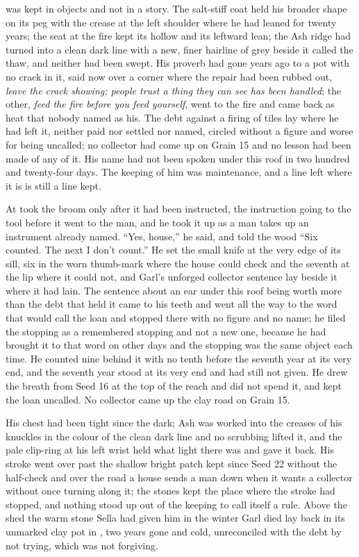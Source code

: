 \scenebreak

 was kept in objects and not in a story. The salt-stiff coat held his broader shape on its peg with the crease at the left shoulder where he had leaned for twenty years; the seat at the fire kept its hollow and its leftward lean; the Ash ridge had turned into a clean dark line with a new, finer hairline of grey beside it called the thaw, and neither had been swept. His proverb had gone years ago to a pot with no crack in it, said now over a corner where the repair had been rubbed out, \emph{leave the crack showing; people trust a thing they can see has been handled}; the other, \emph{feed the fire before you feed yourself}, went to the fire and came back as heat that nobody named as his. The debt against a firing of tiles lay where he had left it, neither paid nor settled nor named, circled without a figure and worse for being uncalled; no collector had come up  on Grain 15 and no lesson had been made of any of it. His name had not been spoken under this roof in two hundred and twenty-four days. The keeping of him was maintenance, and a line left where it is is still a line kept.

At   took the broom only after it had been instructed, the instruction going to the tool before it went to the man, and he took it up as a man takes up an instrument already named. “Yes, house,” he said, and told the wood “Six counted. The next I don't count.” He set the small knife at the very edge of its sill, six in the worn thumb-mark where the house could check and the seventh at the lip where it could not, and Garl's unforged collector sentence lay beside it where it had lain. The sentence about an ear under this roof being worth more than the debt that held it came to his teeth and went all the way to the word that would call the loan and stopped there with no figure and no name; he filed the stopping as a remembered stopping and not a new one, because he had brought it to that word on other days and the stopping was the same object each time. He counted nine behind it with no tenth before the seventh year at its very end, and the seventh year stood at its very end and had still not given. He drew the breath from Seed 16 at the top of the reach and did not spend it, and kept the loan uncalled. No collector came up the clay road on Grain 15.

His chest had been tight since the dark; Ash was worked into the creases of his knuckles in the colour of the clean dark line and no scrubbing lifted it, and the pale clip-ring at his left wrist held what light there was and gave it back. His stroke went over  past the shallow bright patch kept since Seed 22 without the half-check and over the road a house sends a man down when it wants a collector without once turning along it; the stones kept the place where the stroke had stopped, and nothing stood up out of the keeping to call itself a rule. Above the shed the warm stone Sella had given him in the winter Garl died lay back in its unmarked clay pot in , two years gone and cold, unreconciled with the debt by not trying, which was not forgiving.


